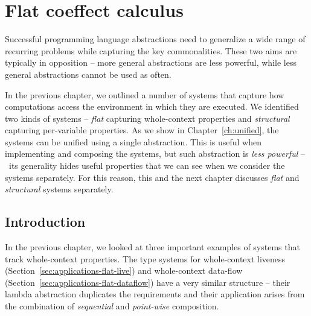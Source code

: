 


\chapter{Flat coeffect calculus} 
\label{ch:flat} 

Successful programming language abstractions need to generalize a wide range of recurring
problems while capturing the key commonalities. These two aims are typically in opposition -- 
more general abstractions are less powerful, while less general abstractions cannot be
used as often.

In the previous chapter, we outlined a number of systems that capture how computations
access the environment in which they are executed. We identified two kinds of systems --
\emph{flat} capturing whole-context properties and \emph{structural} capturing per-variable
properties. As we show in Chapter~\ref{ch:unified}, the systems can be unified using a single 
abstraction. This is useful when implementing and composing the systems, but such abstraction 
is  \emph{less powerful} -- \ie~its generality hides useful properties that we can see 
when we consider the systems separately. For this reason, this and the next chapter discusses 
\emph{flat} and \emph{structural} systems separately.


\section{Introduction}
\label{sec:flat-intro}

In the previous chapter, we looked at three important examples of systems that track whole-context 
properties. The type systems for whole-context liveness (Section~\ref{sec:applications-flat-live}) 
and whole-context data-flow (Section~\ref{sec:applications-flat-dataflow}) have a very similar 
structure -- their lambda abstraction duplicates the requirements and their application arises
from the combination of \emph{sequential} and \emph{point-wise} composition.

